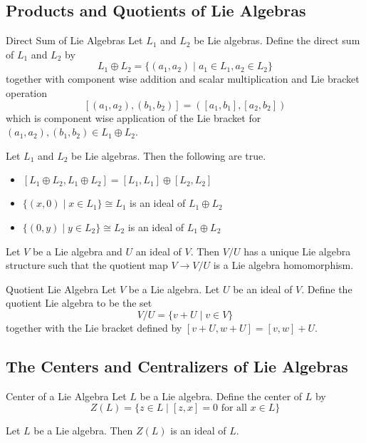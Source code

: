 \documentclass[a4paper]{article}
\begin{document}
\subsection{Products and Quotients of Lie Algebras}
\begin{defn}{Direct Sum of Lie Algebras}{} Let $L_1$ and $L_2$ be Lie algebras. Define the direct sum of $L_1$ and $L_2$ by $$L_1\oplus L_2=\{(a_1,a_2)\;|\;a_1\in L_1,a_2\in L_2\}$$ together with component wise addition and scalar multiplication and Lie bracket operation $$[(a_1,a_2),(b_1,b_2)]=([a_1,b_1],[a_2,b_2])$$ which is component wise application of the Lie bracket for $(a_1,a_2),(b_1,b_2)\in L_1\oplus L_2$. 
\end{defn}

\begin{prp}{}{} Let $L_1$ and $L_2$ be Lie algebras. Then the following are true. 
\begin{itemize}
\item $[L_1\oplus L_2,L_1\oplus L_2]=[L_1,L_1]\oplus[L_2,L_2]$
\item $\{(x,0)\;|\;x\in L_1\}\cong L_1$ is an ideal of $L_1\oplus L_2$
\item $\{(0,y)\;|\;y\in L_2\}\cong L_2$ is an ideal of $L_1\oplus L_2$
\end{itemize}
\end{prp}

\begin{prp}{}{} Let $V$ be a Lie algebra and $U$ an ideal of $V$. Then $V/U$ has a unique Lie algebra structure such that the quotient map $V\to V/U$ is a Lie algebra homomorphism. 
\end{prp}

\begin{defn}{Quotient Lie Algebra}{} Let $V$ be a Lie algebra. Let $U$ be an ideal of $V$. Define the quotient Lie algebra to be the set $$V/U=\{v+U\;|\;v\in V\}$$ together with the Lie bracket defined by $[v+U,w+U]=[v,w]+U$. 
\end{defn}

\subsection{The Centers and Centralizers of Lie Algebras}
\begin{defn}{Center of a Lie Algebra}{} Let $L$ be a Lie algebra. Define the center of $L$ by $$Z(L)=\{z\in L\;|\;[z,x]=0\text{ for all }x\in L\}$$
\end{defn}

\begin{lmm}{}{} Let $L$ be a Lie algebra. Then $Z(L)$ is an ideal of $L$. 
\end{lmm}
\end{document}
